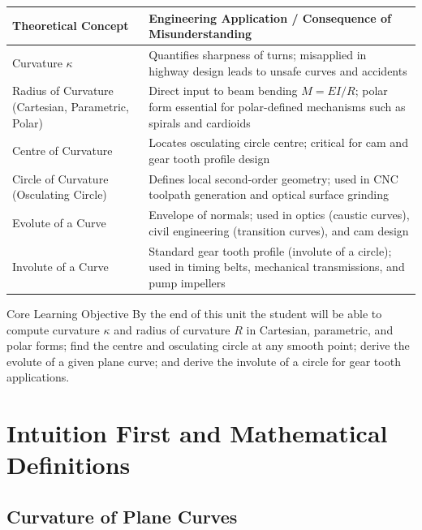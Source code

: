 \documentclass[12pt,a4paper]{article}
\begin{document}
\begin{center}
\begin{tabular}{@{}p{4.5cm} p{9cm}@{}}
\toprule
\textbf{Theoretical Concept} & \textbf{Engineering Application / Consequence of Misunderstanding} \\
\midrule
Curvature $\kappa$ & Quantifies sharpness of turns; misapplied in highway design leads to unsafe curves and accidents \\[4pt]
Radius of Curvature (Cartesian, Parametric, Polar) & Direct input to beam bending $M=EI/R$; polar form essential for polar-defined mechanisms such as spirals and cardioids \\[4pt]
Centre of Curvature & Locates osculating circle centre; critical for cam and gear tooth profile design \\[4pt]
Circle of Curvature (Osculating Circle) & Defines local second-order geometry; used in CNC toolpath generation and optical surface grinding \\[4pt]
Evolute of a Curve & Envelope of normals; used in optics (caustic curves), civil engineering (transition curves), and cam design \\[4pt]
Involute of a Curve & Standard gear tooth profile (involute of a circle); used in timing belts, mechanical transmissions, and pump impellers \\
\bottomrule
\end{tabular}
\end{center}

\begin{learnbox}{Core Learning Objective}
By the end of this unit the student will be able to compute curvature $\kappa$ and radius of curvature $R$ in Cartesian, parametric, and polar forms; find the centre and osculating circle at any smooth point; derive the evolute of a given plane curve; and derive the involute of a circle for gear tooth applications.
\end{learnbox}

\section{Intuition First and Mathematical Definitions}

\subsection{Curvature of Plane Curves}
\end{document}
